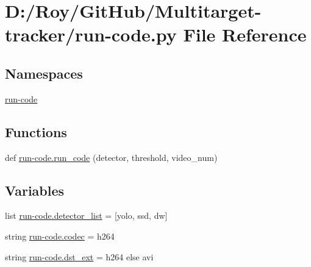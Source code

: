 \hypertarget{run-code_8py}{}\section{D\+:/\+Roy/\+Git\+Hub/\+Multitarget-\/tracker/run-\/code.py File Reference}
\label{run-code_8py}
\subsection*{Namespaces}
\begin{DoxyCompactItemize}
\item 
 \mbox{\hyperlink{namespacerun-code}{run-\/code}}
\end{DoxyCompactItemize}
\subsection*{Functions}
\begin{DoxyCompactItemize}
\item 
def \mbox{\hyperlink{namespacerun-code_a133159db4bd6772312bbf5daa57bd0b3}{run-\/code.\+run\+\_\+code}} (detector, threshold, video\+\_\+num)
\end{DoxyCompactItemize}
\subsection*{Variables}
\begin{DoxyCompactItemize}
\item 
list \mbox{\hyperlink{namespacerun-code_a964a9f5de3531be378abf4081befc9d2}{run-\/code.\+detector\+\_\+list}} = \mbox{[}\textquotesingle{}yolo\textquotesingle{}, \textquotesingle{}ssd\textquotesingle{}, \textquotesingle{}dw\textquotesingle{}\mbox{]}
\item 
string \mbox{\hyperlink{namespacerun-code_a8fd3f499f581f73e709f1dccdcf91b3f}{run-\/code.\+codec}} = \textquotesingle{}h264\textquotesingle{}
\item 
string \mbox{\hyperlink{namespacerun-code_ac7f7fa370ecddff28d73a3ed6c0375e5}{run-\/code.\+dst\+\_\+ext}} = \textquotesingle{}h264\textquotesingle{} else \textquotesingle{}avi\textquotesingle{}
\end{DoxyCompactItemize}
